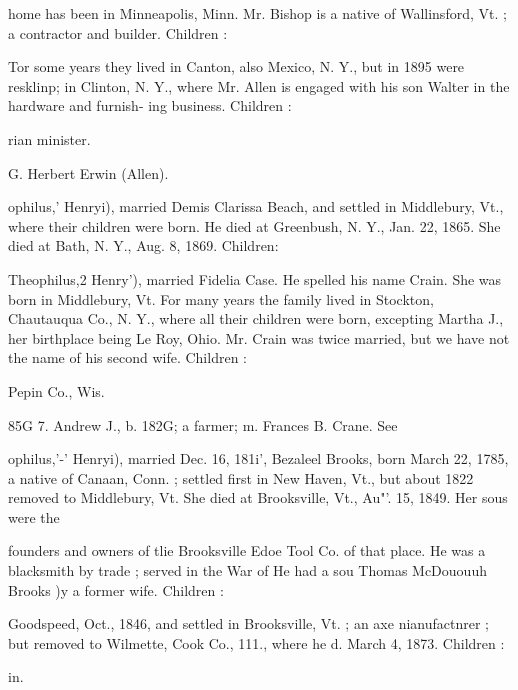\documentclass{book}
\begin{document}
home has been in Minneapolis, Minn. Mr. Bishop is a native 
of Wallinsford, Vt. ; a contractor and builder. Children : 



Tor some years they lived in Canton, also Mexico, N. Y., 
but in 1895 were resklinp; in Clinton, N. Y., where Mr. Allen 
is engaged with his son Walter in the hardware and furnish- 
ing business. Children : 




rian minister. 



G. Herbert Erwin (Allen). 



ophilus,' Henryi), married Demis Clarissa Beach, and settled in 
Middlebury, Vt., where their children were born. He died at 
Greenbush, N. Y., Jan. 22, 1865. She died at Bath, N. Y., 
Aug. 8, 1869. Children: 






Theophilus,2 Henry'), married Fidelia Case. He spelled his 
name Crain. She was born in Middlebury, Vt. For many years 
the family lived in Stockton, Chautauqua Co., N. Y., where all 
their children were born, excepting Martha J., her birthplace 
being Le Roy, Ohio. Mr. Crain was twice married, but we have 
not the name of his second wife. Children : 



Pepin Co., Wis. 


85G 7. Andrew J., b. 182G; a farmer; m. Frances B. Crane. See 


ophilus,'-' Henryi), married Dec. 16, 181i', Bezaleel Brooks, born 
March 22, 1785, a native of Canaan, Conn. ; settled first in New 
Haven, Vt., but about 1822 removed to Middlebury, Vt. She 
died at Brooksville, Vt., Au"'. 15, 1849. Her sous were the 




founders and owners of tlie Brooksville Edoe Tool Co. of that 
place. He was a blacksmith by trade ; served in the War of 
He had a sou Thomas McDououuh Brooks )y a former wife. 
Children : 







Goodspeed, Oct., 1846, and settled in Brooksville, Vt. ; an axe 
nianufactnrer ; but removed to Wilmette, Cook Co., 111., 
where he d. March 4, 1873. Children : 


in. 
\end{document}
